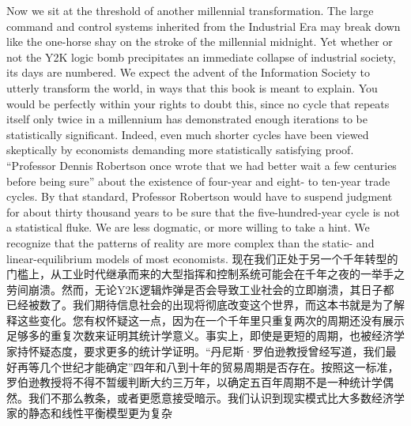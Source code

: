 \begin{Parallel}{97mm}{45mm}
  \ParallelLText
  {Now we sit at the threshold of another millennial transformation. The large command and control systems inherited from the Industrial Era may break down like the one-horse shay on the stroke of the millennial midnight. Yet whether or not the Y2K logic bomb precipitates an immediate collapse of industrial society, its days are numbered. We expect the advent of the Information Society to utterly transform the world, in ways that this book is meant to explain. You would be perfectly within your rights to doubt this, since no cycle that repeats itself only twice in a millennium has demonstrated enough iterations to be statistically significant. Indeed, even much shorter cycles have been viewed skeptically by economists demanding more statistically satisfying proof. “Professor Dennis Robertson once wrote that we had better wait a few centuries before being sure” about the existence of four-year and eight- to ten-year trade cycles. By that standard, Professor Robertson would have to suspend judgment for about thirty thousand years to be sure that the five-hundred-year cycle is not a statistical fluke. We are less dogmatic, or more willing to take a hint. We recognize that the patterns of reality are more complex than the static- and linear-equilibrium models of most economists.  }  
  \ParallelRText
  {\small 现在我们正处于另一个千年转型的门槛上，从工业时代继承而来的大型指挥和控制系统可能会在千年之夜的一举手之劳间崩溃。然而，无论Y2K逻辑炸弹是否会导致工业社会的立即崩溃，其日子都已经被数了。我们期待信息社会的出现将彻底改变这个世界，而这本书就是为了解释这些变化。您有权怀疑这一点，因为在一个千年里只重复两次的周期还没有展示足够多的重复次数来证明其统计学意义。事实上，即使是更短的周期，也被经济学家持怀疑态度，要求更多的统计学证明。“丹尼斯·罗伯逊教授曾经写道，我们最好再等几个世纪才能确定”四年和八到十年的贸易周期是否存在。按照这一标准，罗伯逊教授将不得不暂缓判断大约三万年，以确定五百年周期不是一种统计学偶然。我们不那么教条，或者更愿意接受暗示。我们认识到现实模式比大多数经济学家的静态和线性平衡模型更为复杂}
  \ParallelPar


\end{Parallel}
